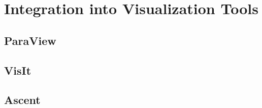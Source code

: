 \section{Integration into Visualization Tools}

\subsection{ParaView}

\subsection{VisIt}

\subsection{Ascent}
